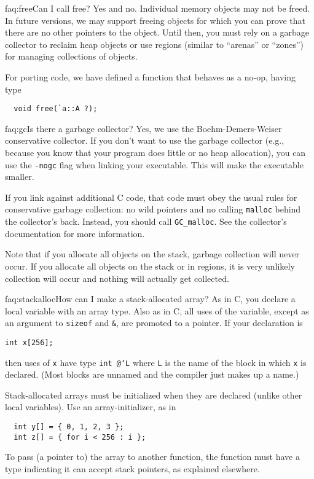 \begin{faqa}{faq:free}{Can I call free?}
Yes and no. Individual memory objects may not be freed.  In future versions,
we may support freeing objects for which you can prove that there are no
other pointers to the object.  Until then, you must rely on a garbage
collector to reclaim heap objects or use regions (similar to ``arenas'' or
``zones'') for managing collections of objects.

For porting code, we have defined a  function that behaves as a
no-op, having type
\begin{verbatim}
  void free(`a::A ?);
\end{verbatim}
\end{faqa}

\begin{faqa}{faq:gc}{Is there a garbage collector?}
Yes, we use the Boehm-Demers-Weiser conservative collector.  If you
don't want to use the garbage collector (e.g., because you know that
your program does little or no heap allocation), you can use the
\texttt{-nogc} flag when linking your executable.  This will make the
executable smaller.

If you link against additional C code, that code must obey the usual
rules for conservative garbage collection: no wild pointers and no
calling \texttt{malloc} behind the collector's back.  Instead, you
should call \texttt{GC_malloc}.  See the collector's documentation for
more information.

Note that if you allocate all objects on the stack, garbage collection
will never occur.  If you allocate all objects on the stack or in
regions, it is very unlikely collection will occur and nothing will
actually get collected.
\end{faqa}

\begin{faqa}{faq:stackalloc}{How can I make a stack-allocated array?}
As in C, you declare a local variable with an array type.  Also as in
C, all uses of the variable, except as an argument to \texttt{sizeof}
and \texttt{\&}, are promoted to a pointer.  If your declaration is
\begin{verbatim}
int x[256];
\end{verbatim}
then uses of \texttt{x} have type \texttt{int @`L\rb} where
\texttt{L} is the name of the block in which \texttt{x} is declared.
(Most blocks are unnamed and the compiler just makes up a name.)

Stack-allocated arrays must be initialized when they are declared
(unlike other local variables).  Use an array-initializer, as in
\begin{verbatim}
  int y[] = { 0, 1, 2, 3 };
  int z[] = { for i < 256 : i };
\end{verbatim}

To pass (a pointer to) the array to another function, the function
must have a type indicating it can accept stack pointers, as explained
elsewhere.
\end{faqa}

